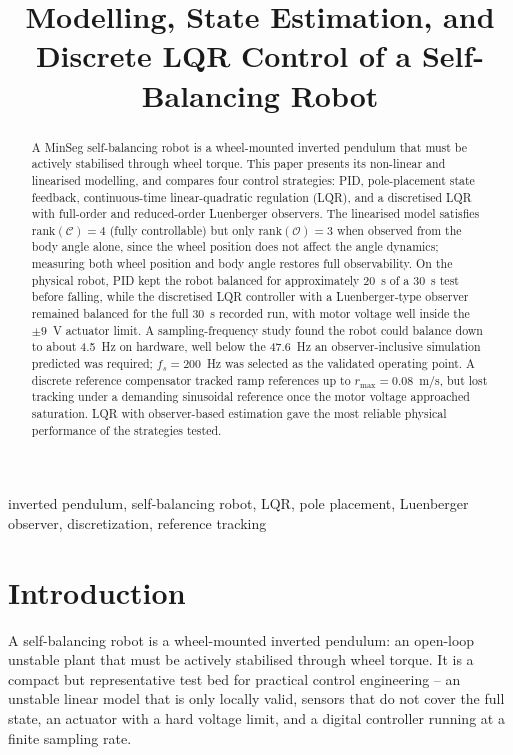 \documentclass[conference]{IEEEtran}
\begin{document}
\title{Modelling, State Estimation, and Discrete LQR Control of a Self-Balancing Robot}

\author{
}

\maketitle

\begin{abstract}
A MinSeg self-balancing robot is a wheel-mounted inverted pendulum that must be actively stabilised through wheel torque. This paper presents its non-linear and linearised modelling, and compares four control strategies: PID, pole-placement state feedback, continuous-time linear-quadratic regulation (LQR), and a discretised LQR with full-order and reduced-order Luenberger observers. The linearised model satisfies $\mathrm{rank}(\mathcal{C})=4$ (fully controllable) but only $\mathrm{rank}(\mathcal{O})=3$ when observed from the body angle alone, since the wheel position does not affect the angle dynamics; measuring both wheel position and body angle restores full observability. On the physical robot, PID kept the robot balanced for approximately 20~s of a 30~s test before falling, while the discretised LQR controller with a Luenberger-type observer remained balanced for the full 30~s recorded run, with motor voltage well inside the $\pm9$~V actuator limit. A sampling-frequency study found the robot could balance down to about 4.5~Hz on hardware, well below the 47.6~Hz an observer-inclusive simulation predicted was required; $f_s=200$~Hz was selected as the validated operating point. A discrete reference compensator tracked ramp references up to $r_{\max}=0.08$~m/s, but lost tracking under a demanding sinusoidal reference once the motor voltage approached saturation. LQR with observer-based estimation gave the most reliable physical performance of the strategies tested.
\end{abstract}

\begin{IEEEkeywords}
inverted pendulum, self-balancing robot, LQR, pole placement, Luenberger observer, discretization, reference tracking
\end{IEEEkeywords}

\section{Introduction}
A self-balancing robot is a wheel-mounted inverted pendulum: an open-loop unstable plant that must be actively stabilised through wheel torque. It is a compact but representative test bed for practical control engineering -- an unstable linear model that is only locally valid, sensors that do not cover the full state, an actuator with a hard voltage limit, and a digital controller running at a finite sampling rate.
\end{document}
